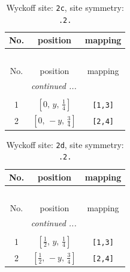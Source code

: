 \documentclass[fleqn,8pt]{jsarticle}
\begin{document}
\renewcommand{\arraystretch}{1.2}
\begin{longtable}{ccc}
\caption{Wyckoff site: {\tt 2c}, site symmetry: {\tt .2.}}
 \\
 \hline \hline
No. & position & mapping \\ \hline \endfirsthead

\multicolumn{2}{l}{\tablename\ \thetable{}} \\
 \hline \hline
No. & position & mapping \\ \hline \endhead

 \hline \hline
\multicolumn{2}{r}{\footnotesize\it continued ...} \\ \endfoot

 \hline \hline
\multicolumn{2}{r}{} \\ \endlastfoot

1 & $\left[ 0,\, y,\, \frac{1}{4} \right]$ & {\tt [1,3]} \\ \hline
2 & $\left[ 0,\, - y,\, \frac{3}{4} \right]$ & {\tt [2,4]} \\
\end{longtable}
\renewcommand{\arraystretch}{1.2}
\begin{longtable}{ccc}
\caption{Wyckoff site: {\tt 2d}, site symmetry: {\tt .2.}}
 \\
 \hline \hline
No. & position & mapping \\ \hline \endfirsthead

\multicolumn{2}{l}{\tablename\ \thetable{}} \\
 \hline \hline
No. & position & mapping \\ \hline \endhead

 \hline \hline
\multicolumn{2}{r}{\footnotesize\it continued ...} \\ \endfoot

 \hline \hline
\multicolumn{2}{r}{} \\ \endlastfoot

1 & $\left[ \frac{1}{2},\, y,\, \frac{1}{4} \right]$ & {\tt [1,3]} \\ \hline
2 & $\left[ \frac{1}{2},\, - y,\, \frac{3}{4} \right]$ & {\tt [2,4]} \\
\end{longtable}
\renewcommand{\arraystretch}{1.2}
\end{document}

